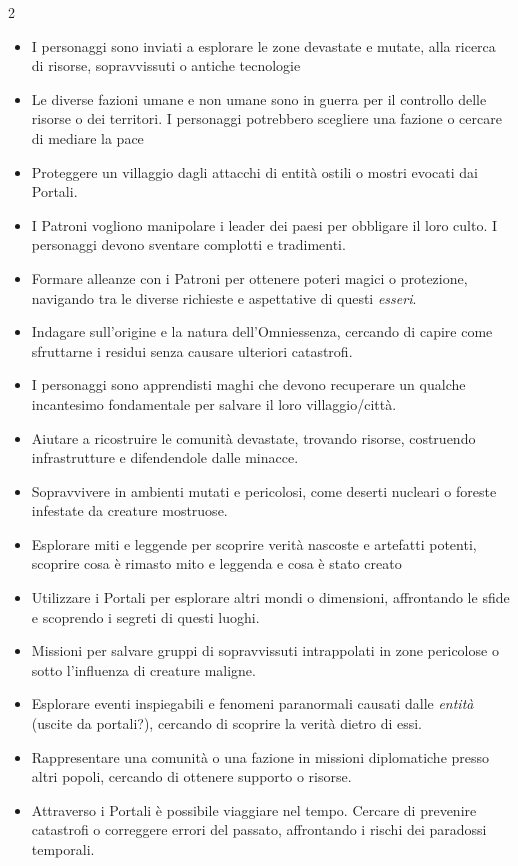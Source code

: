 \begin{multicols}{2}
\begin{itemize}[leftmargin=*] \setlength{\itemsep}{0pt}
\item I personaggi sono inviati a esplorare le zone devastate e mutate, alla ricerca di risorse, sopravvissuti o antiche tecnologie
\item Le diverse fazioni umane e non umane sono in guerra per il controllo delle risorse o dei territori. I personaggi potrebbero scegliere una fazione o cercare di mediare la pace
\item Proteggere un villaggio dagli attacchi di entità ostili o mostri evocati dai Portali.
\item I Patroni vogliono manipolare i leader dei paesi per obbligare il loro culto. I personaggi devono sventare complotti e tradimenti.
\item Formare alleanze con i Patroni per ottenere poteri magici o protezione, navigando tra le diverse richieste e aspettative di questi \emph{esseri}.
\item Indagare sull'origine e la natura dell'Omniessenza, cercando di capire come sfruttarne i residui senza causare ulteriori catastrofi.
\item I personaggi sono apprendisti maghi che devono recuperare un qualche incantesimo fondamentale per salvare il loro villaggio/città.
\item Aiutare a ricostruire le comunità devastate, trovando risorse, costruendo infrastrutture e difendendole dalle minacce.
\item Sopravvivere in ambienti mutati e pericolosi, come deserti nucleari o foreste infestate da creature mostruose.
\item Esplorare miti e leggende per scoprire verità nascoste e artefatti potenti, scoprire cosa è rimasto mito e leggenda e cosa è stato creato
\item Utilizzare i Portali per esplorare altri mondi o dimensioni, affrontando le sfide e scoprendo i segreti di questi luoghi.
\item Missioni per salvare gruppi di sopravvissuti intrappolati in zone pericolose o sotto l'influenza di creature maligne.
\item Esplorare eventi inspiegabili e fenomeni paranormali causati dalle \emph{entità} (uscite da portali?), cercando di scoprire la verità dietro di essi.
\item Rappresentare una comunità o una fazione in missioni diplomatiche presso altri popoli, cercando di ottenere supporto o risorse.
\item Attraverso i Portali è possibile viaggiare nel tempo. Cercare di prevenire catastrofi o correggere errori del passato, affrontando i rischi dei paradossi temporali.

\end{itemize}
\end{multicols}

